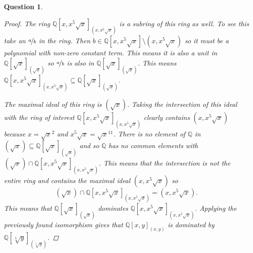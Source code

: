 \documentclass{article}
\newcommand{\Q}{\mathbb{Q}}
\newtheorem{question}{Question}
\theoremstyle{definition}
\begin{document}
\begin{question}
\begin{enumerate}[(a)]
\begin{proof}
                  The ring \(\Q[x,x^{5}\sqrt{x}]_{(x,x^{5}\sqrt{x})}\) is a
                  subring of this ring as well. To see this take an
                  \(\nicefrac{a}{b}\) in the ring. Then
                  \(b\in\Q[x,x^{5}\sqrt{x}]\setminus(x,x^{5}\sqrt{x})\) so it
                  must be a polynomial with non-zero constant term. This means
                  it is also a unit in \(\Q[\sqrt{x}]_{(\sqrt{x})}\) so
                  \(\nicefrac{a}{b}\) is also in \(\Q[\sqrt{x}]_{(\sqrt{x})}\).
                  This means
                  \(\Q[x,x^{5}\sqrt{x}]_{(x,x^{5}\sqrt{x})}\subseteq\Q[\sqrt{x}]_{(\sqrt{x})}\).

                  The maximal ideal of this ring is \((\sqrt{x})\). Taking the
                  intersection of this ideal with the ring of interest
                  \(\Q[x,x^{5}\sqrt{x}]_{(x,x^{5}\sqrt{x})}\) clearly contains
                  \((x,x^{5}\sqrt{x})\) because \(x=\sqrt{x}^{2}\) and
                  \(x^{5}\sqrt{x}=\sqrt{x}^{11}\). There is no element of \(\Q\)
                  in \((\sqrt{x})\subseteq\Q[\sqrt{x}]_{(\sqrt{x})}\) and so
                  \(\Q\) has no common elements with
                  \((\sqrt{x})\cap\Q[x,x^{5}\sqrt{x}]_{(x,x^{5}\sqrt{x})}\).
                  This means that the intersection is not the entire ring and
                  contains the maximal ideal \((x,x^{5}\sqrt{x})\) so
                  \[
                      (\sqrt{x})\cap\Q[x,x^{5}\sqrt{x}]_{(x,x^{5}\sqrt{x})}=(x,x^{5}\sqrt{x}).
                  \]
                  This means that \(\Q[\sqrt{x}]_{(\sqrt{x})}\) dominates
                  \(\Q[x,x^{5}\sqrt{x}]_{(x,x^{5}\sqrt{x})}\). Applying the
                  previously found isomorphism gives that \(\Q[x,y]_{(x,y)}\) is
                  dominated by \(\Q[\sqrt[5]{y}]_{(\sqrt[5]{y})}\).
              \end{proof}
    \end{enumerate}
\end{question}
\end{document}
